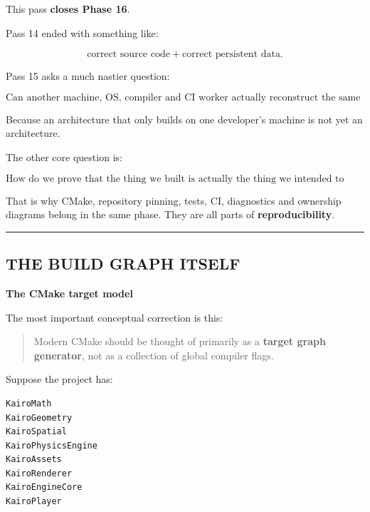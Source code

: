 \hypertarget{01-foundations-i-ch010-cmake-target-semantics-usage-requirements-presets-ninja-dags-toolchains-clangmsvc-portability-c-modules-repository-pinning-reproducible-superbuilds-ci-matrices-test-architecture-crashloggingprofiling-hooks-portable-engine-boundaries-and-the-complete-sourceeditorpackageruntime-ownership-graph}{}

This pass \textbf{closes Phase 16}.

Pass 14 ended with something like:

\[
\text{correct source code}
+
\text{correct persistent data}.
\]

Pass 15 asks a much nastier question:

\[
\boxed{
\text{Can another machine, OS, compiler and CI worker actually reconstruct the same engine correctly?}
}
\]

Because an architecture that only builds on one developer's machine is not yet an architecture.

The other core question is:

\[
\boxed{
\text{How do we prove that the thing we built is actually the thing we intended to build?}
}
\]

That is why CMake, repository pinning, tests, CI, diagnostics and ownership diagrams belong in the same phase. They are all parts of \textbf{reproducibility}.

\begin{center}\rule{0.5\linewidth}{0.5pt}\end{center}

\subsection{THE BUILD GRAPH ITSELF}\label{01-foundations-i-ch010-the-build-graph-itself}

\hypertarget{01-foundations-i-ch010-the-build-graph-itself}{}

\textbf{The CMake target model}

The most important conceptual correction is this:

\begin{quote}
Modern CMake should be thought of primarily as a \textbf{target graph generator}, not as a collection of global compiler flags.
\end{quote}

Suppose the project has:

\begin{verbatim}
KairoMath
KairoGeometry
KairoSpatial
KairoPhysicsEngine
KairoAssets
KairoRenderer
KairoEngineCore
KairoPlayer
\end{verbatim}

